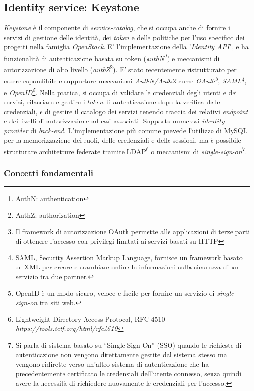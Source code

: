 \subsection{Identity service: Keystone}
\textit{Keystone} è il componente di \textit{service-catalog}, che si occupa anche di fornire i servizi di gestione delle identità, dei \textit{token} e delle politiche per l'uso specifico dei progetti nella famiglia \textit{OpenStack}.
E' l'implementazione della "\textit{Identity API}", e ha funzionalità di autenticazione basata su token (\textit{authN\footnote{AuthN: authentication}}) e meccanismi di autorizzazione di alto livello (\textit{authZ}\footnote{AuthZ: authorization}).
E' stato recentemente ristrutturato per essere espandibile e supportare meccanismi \textit{AuthN/AuthZ} come \textit{OAuth\footnote{Il framework di autorizzazione OAuth permette alle applicazioni di terze parti di ottenere l'accesso con privilegi limitati ai servizi basati su HTTP\cite{OAuth}}}, \textit{SAML\footnote{SAML, Security Assertion Markup Language, fornisce un framework basato su XML per creare e scambiare online le informazioni sulla sicurezza di un servizio tra due partner.\cite{SAML}}}, e \textit{OpenID\footnote{OpenID è un modo sicuro, veloce e facile per fornire un servizio di \textit{single-sign-on} tra siti web.\cite{OpenID}}}.
Nella pratica, si occupa di validare le credenziali degli utenti e dei servizi, rilasciare e gestire i \textit{token} di autenticazione dopo la verifica delle credenziali, e di gestire il catalogo dei servizi tenendo traccia dei relativi \textit{endpoint} e dei livelli di autorizzazione ad essi associati.
Supporta numerosi \textit{identity provider} di \textit{back-end}. L'implementazione più comune prevede l'utilizzo di MySQL per la memorizzazione dei ruoli, delle credenziali e delle sessioni, ma è possibile strutturare architetture federate tramite LDAP\footnote{Lightweight Directory Access Protocol, RFC 4510 - \textit{https://tools.ietf.org/html/rfc4510}} o meccanismi di \textit{single-sign-on}\footnote{Si parla di sistema basato su “Single Sign On” (SSO) quando le richieste di autenticazione non vengono direttamente gestite dal sistema stesso ma vengono ridirette verso un’altro sistema di autenticazione che ha precedentemente certificato le credenziali dell’utente connesso, senza quindi avere la necessità di richiedere nuovamente le credenziali per l’accesso.\cite{SSO}}.

\subsubsection{Concetti fondamentali}

